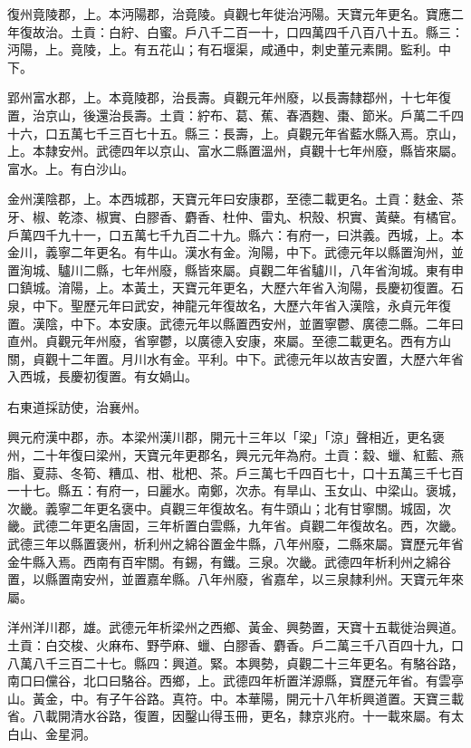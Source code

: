 \begin{pinyinscope}
 復州竟陵郡，上。本沔陽郡，治竟陵。貞觀七年徙治沔陽。天寶元年更名。寶應二年復故治。土貢：白紵、白蜜。戶八千二百一十，口四萬四千八百八十五。縣三：沔陽，上。竟陵，上。有五花山；有石堰渠，咸通中，刺史董元素開。監利。中下。



 郢州富水郡，上。本竟陵郡，治長壽。貞觀元年州廢，以長壽隸鄀州，十七年復置，治京山，後還治長壽。土貢：紵布、葛、蕉、春酒麴、棗、節米。戶萬二千四十六，口五萬七千三百七十五。縣三：長壽，上。貞觀元年省藍水縣入焉。京山，上。本隸安州。武德四年以京山、富水二縣置溫州，貞觀十七年州廢，縣皆來屬。富水。上。有白沙山。



 金州漢陰郡，上。本西城郡，天寶元年曰安康郡，至德二載更名。土貢：麩金、茶牙、椒、乾漆、椒實、白膠香、麝香、杜仲、雷丸、枳殼、枳實、黃蘗。有橘官。戶萬四千九十一，口五萬七千九百二十九。縣六：有府一，曰洪義。西城，上。本金川，義寧二年更名。有牛山。漢水有金。洵陽，中下。武德元年以縣置洵州，並置洵城、驢川二縣，七年州廢，縣皆來屬。貞觀二年省驢川，八年省洵城。東有申口鎮城。淯陽，上。本黃土，天寶元年更名，大歷六年省入洵陽，長慶初復置。石泉，中下。聖歷元年曰武安，神龍元年復故名，大歷六年省入漢陰，永貞元年復置。漢陰，中下。本安康。武德元年以縣置西安州，並置寧鬱、廣德二縣。二年曰直州。貞觀元年州廢，省寧鬱，以廣德入安康，來屬。至德二載更名。西有方山關，貞觀十二年置。月川水有金。平利。中下。武德元年以故吉安置，大歷六年省入西城，長慶初復置。有女媧山。



 右東道採訪使，治襄州。



 興元府漢中郡，赤。本梁州漢川郡，開元十三年以「梁」「涼」聲相近，更名褒州，二十年復曰梁州，天寶元年更郡名，興元元年為府。土貢：縠、蠟、紅藍、燕脂、夏蒜、冬筍、糟瓜、柑、枇杷、茶。戶三萬七千四百七十，口十五萬三千七百一十七。縣五：有府一，曰麗水。南鄭，次赤。有旱山、玉女山、中梁山。褒城，次畿。義寧二年更名褒中。貞觀三年復故名。有牛頭山；北有甘寧關。城固，次畿。武德二年更名唐固，三年析置白雲縣，九年省。貞觀二年復故名。西，次畿。武德三年以縣置褒州，析利州之綿谷置金牛縣，八年州廢，二縣來屬。寶歷元年省金牛縣入焉。西南有百牢關。有錫，有鐵。三泉。次畿。武德四年析利州之綿谷置，以縣置南安州，並置嘉牟縣。八年州廢，省嘉牟，以三泉隸利州。天寶元年來屬。



 洋州洋川郡，雄。武德元年析梁州之西鄉、黃金、興勢置，天寶十五載徙治興道。土貢：白交梭、火麻布、野苧麻、蠟、白膠香、麝香。戶二萬三千八百四十九，口八萬八千三百二十七。縣四：興道。緊。本興勢，貞觀二十三年更名。有駱谷路，南口曰儻谷，北口曰駱谷。西鄉，上。武德四年析置洋源縣，寶歷元年省。有雲亭山。黃金，中。有子午谷路。真符。中。本華陽，開元十八年析興道置。天寶三載省。八載開清水谷路，復置，因鑿山得玉冊，更名，隸京兆府。十一載來屬。有太白山、金星洞。




\end{pinyinscope}

